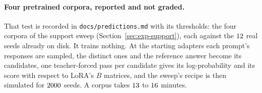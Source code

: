 \paragraph{Four pretrained corpora, reported and not graded.} That test is recorded in
\texttt{docs/predictions.md} with its thresholds: the four corpora of the support sweep
(Section~\ref{sec:exp-support}), each against the $12$ real seeds already
on disk. It trains nothing. At the starting adapters each prompt's responses are sampled, the
distinct ones and the reference answer become its candidates, one teacher-forced pass per
candidate gives its log-probability and its score with respect to LoRA's $B$ matrices, and the
sweep's recipe is then simulated for $2000$ seeds. A corpus takes
$13$ to $16$ minutes.

